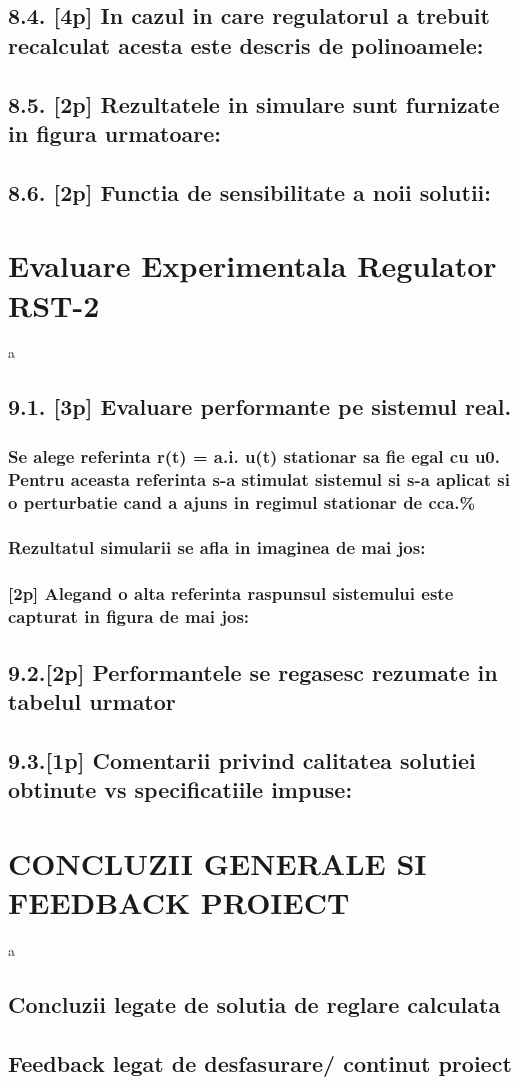 \documentclass[12pt,english]{article}
\begin{document}
\subsection {8.4. [4p] In cazul in care regulatorul a trebuit recalculat acesta este descris de polinoamele: }
\subsection {8.5. [2p] Rezultatele in simulare sunt furnizate in figura urmatoare: }
\subsection {8.6. [2p] Functia de sensibilitate a noii solutii: }

\section {Evaluare Experimentala Regulator RST-2 }
a
\subsection {9.1. [3p] Evaluare performante pe sistemul real. }
\subsubsection {Se alege referinta r(t) = a.i. u(t) stationar sa fie egal cu u0. Pentru aceasta referinta s-a stimulat sistemul si s-a aplicat si o perturbatie cand a ajuns in regimul stationar de cca.\% }
\subsubsection {Rezultatul simularii se afla in imaginea de mai jos: }
\subsubsection {[2p] Alegand o alta referinta raspunsul sistemului este capturat in figura de mai jos: }
\subsection {9.2.[2p] Performantele se regasesc rezumate in tabelul urmator }
\subsection {9.3.[1p] Comentarii privind calitatea solutiei obtinute vs specificatiile impuse: }

\section {CONCLUZII GENERALE SI FEEDBACK PROIECT }
a
\subsection {Concluzii legate de solutia de reglare calculata }
\subsection {Feedback legat de desfasurare/ continut proiect }
\end{document}
